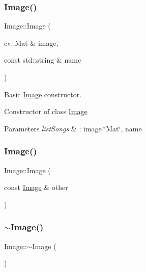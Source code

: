 \subsubsection{\texorpdfstring{Image()}{Image()}\hspace{0.1cm}{\footnotesize\ttfamily [1/2]}}
{\footnotesize\ttfamily Image\+::\+Image (\begin{DoxyParamCaption}\item[{cv\+::\+Mat \&}]{image,  }\item[{const std\+::string \&}]{name }\end{DoxyParamCaption})}



Basic \hyperlink{class_image}{Image} constructor. 

Constructor of class \hyperlink{class_image}{Image}


\begin{DoxyParams}{Parameters}
{\em list\+Songs} & \+: image \char`\"{}\+Mat\char`\"{}, name \\
\hline
\end{DoxyParams}
\mbox{\label{class_image_a5a3bc57bd7ba53f9ae55b1963b9ba0a1}} 
\subsubsection{\texorpdfstring{Image()}{Image()}\hspace{0.1cm}{\footnotesize\ttfamily [2/2]}}
{\footnotesize\ttfamily Image\+::\+Image (\begin{DoxyParamCaption}\item[{const \hyperlink{class_image}{Image} \&}]{other }\end{DoxyParamCaption})}

\mbox{\label{class_image_a0294f63700543e11c0f0da85601c7ae5}} 
\subsubsection{\texorpdfstring{$\sim$\+Image()}{~Image()}}
{\footnotesize\ttfamily Image\+::$\sim$\+Image (\begin{DoxyParamCaption}{ }\end{DoxyParamCaption})}



